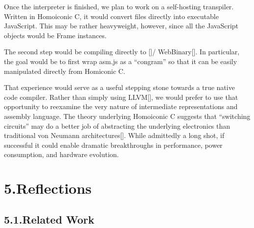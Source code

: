 \documentclass[preprint]{{acmart}}
\begin{document}
\noindent{}Once the interpreter is finished, we plan to work on a self-hosting
transpiler. Written in Homoiconic C, it would convert  files
directly into executable JavaScript. This may be rather heavyweight,
however, since all the JavaScript objects would be Frame
instances.%

The second step would be compiling directly to []/
WebBinary[]. In particular, the goal would be to first wrap asm.js
as a \textquotedblleft{}congram\textquotedblright{} so that it can be easily manipulated directly from Homiconic C.%

That experience would serve as a useful stepping stone towards a true
native code compiler. Rather than simply using LLVM[], we would
prefer to use that opportunity to reexamine the very nature of
intermediate representations and assembly language. The theory underlying
Homoiconic C suggests that \textquotedblleft{}switching circuits\textquotedblright{} may do a better job of
abstracting the underlying electronics than traditional von Neumann
architectures[]. While admittedly a long shot, if successful it
could enable dramatic breakthroughs in performance, power consumption,
and hardware evolution.%

\section{5.\hspace*{0.5em}Reflections}\label{sec-reflections}%

\subsection{5.1.\hspace*{0.5em}Related Work}\label{sec-related-work}%
\end{document}
